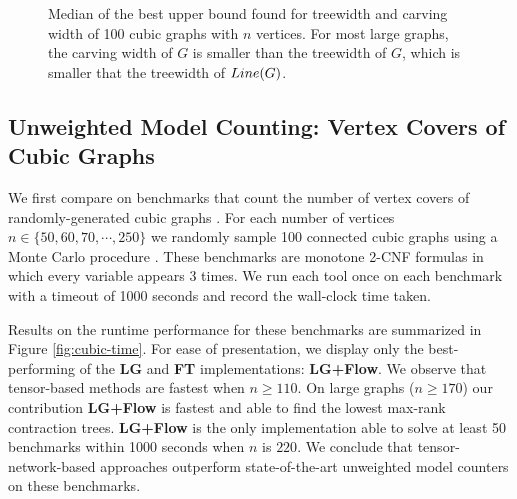 \begin{figure}
	\centering
	
	\caption{\label{fig:vertex-cover-width} Median of the best upper bound found for treewidth and carving width of 100 cubic graphs with $n$ vertices. For most large graphs, the carving width of $G$ is smaller than the treewidth of $G$, which is smaller that the treewidth of $Line(G)$.}
\end{figure}

%	

%	

\subsection{Unweighted Model Counting: Vertex Covers of Cubic Graphs}
\label{sec:tensors:experiments:cubic}

We first compare on benchmarks that count the number of vertex covers of randomly-generated cubic graphs \cite{KCMR18}. For each number of vertices $n \in \{50, 60, 70, \cdots, 250\}$ we randomly sample 100 connected cubic graphs using a Monte Carlo procedure \cite{VL05}. These benchmarks are monotone 2-CNF formulas in which every variable appears 3 times. We run each tool once on each benchmark with a timeout of 1000 seconds and record the wall-clock time taken. \the\textwidth

Results on the runtime performance for these benchmarks are summarized in Figure \ref{fig:cubic-time}. For ease of presentation, we display only the best-performing of the \textbf{LG} and \textbf{FT} implementations: \textbf{LG+Flow}. We observe that tensor-based methods are fastest when $n \geq 110$. On large graphs ($n \geq 170$) our contribution \textbf{LG+Flow} is fastest and able to find the lowest max-rank contraction trees. \textbf{LG+Flow} is the only implementation able to solve at least 50 benchmarks within 1000 seconds when $n$ is $220$. We conclude that tensor-network-based approaches outperform state-of-the-art unweighted model counters on these benchmarks.

